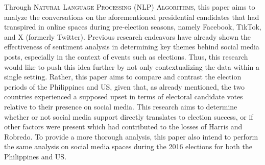 Through \textsc{Natural Language Processing (NLP) Algorithms}, this paper aims to analyze the conversations on the aforementioned presidential candidates that had transpired in online spaces during pre-election seasons, namely Facebook, TikTok, and X (formerly Twitter). Previous research endeavors have already shown the effectiveness of sentiment analysis in determining key themes behind social media posts, especially in the context of events such as elections. Thus, this research would like to push this idea further by not only contextualizing the data within a single setting. Rather, this paper aims to compare and contrast the election periods of the Philippines and US, given that, as already mentioned, the two countries experienced a supposed upset in terms of electoral candidate votes relative to their presence on social media. This research aims to determine whether or not social media support directly translates to election success, or if other factors were present which had contributed to the losses of Harris and Robredo. To provide a more thorough analysis, this paper also intend to perform the same analysis on social media spaces during the 2016 elections for both the Philippines and US.
